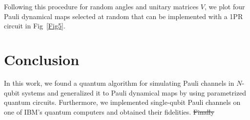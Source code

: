 \documentclass[10pt,letterpaper]{article} %
\newcommand{\fref}[1]{Fig~\ref{#1}}
\providecommand{\DIFdeltex}[1]{{\protect\color{red}\sout{#1}}}                      %
\providecommand{\DIFaddbegin}{} %
\providecommand{\DIFdelbegin}{} %
\providecommand{\DIFdelend}{} %
\providecommand{\DIFdel}[1]{\texorpdfstring{\DIFdeltex{#1}}{}} %
\newcommand{\DIFscaledelfig}{0.5}
\newlength{\DIFdelgraphicswidth} %
\newlength{\DIFdelgraphicsheight} %
\newcommand{\DIFaddincludegraphics}[2][]{{\color{blue}\fbox{\DIFOincludegraphics[#1]{#2}}}} %
\newcommand{\DIFdelincludegraphics}[2][]{%
\sbox{\DIFdelgraphicsbox}{\DIFOincludegraphics[#1]{#2}}%
\settoboxwidth{\DIFdelgraphicswidth}{\DIFdelgraphicsbox} %
\settoboxtotalheight{\DIFdelgraphicsheight}{\DIFdelgraphicsbox} %
\scalebox{\DIFscaledelfig}{%
\parbox[b]{\DIFdelgraphicswidth}{\usebox{\DIFdelgraphicsbox}\\[-\baselineskip] \rule{\DIFdelgraphicswidth}{0em}}\llap{\resizebox{\DIFdelgraphicswidth}{\DIFdelgraphicsheight}{%
\setlength{\unitlength}{\DIFdelgraphicswidth}%
\begin{picture}(1,1)%
\thicklines\linethickness{2pt} %
{\color[rgb]{1,0,0}\put(0,0){\framebox(1,1){}}}%
{\color[rgb]{1,0,0}\put(0,0){\line( 1,1){1}}}%
{\color[rgb]{1,0,0}\put(0,1){\line(1,-1){1}}}%
\end{picture}%
}\hspace*{3pt}}} %
} %
\DeclareRobustCommand{\DIFaddbegin}{\DIFOaddbegin \let\includegraphics\DIFaddincludegraphics} %
\DeclareRobustCommand{\DIFdelbegin}{\DIFOdelbegin \let\includegraphics\DIFdelincludegraphics} %
\DeclareRobustCommand{\DIFdelend}{\DIFOaddend \let\includegraphics\DIFOincludegraphics} %
\begin{document}
Following this procedure for random
angles and unitary matrices $V$, 
we plot four Pauli dynamical maps  selected at random
that can be implemented with a 1PR circuit in \fref{Fig5}. 

\section{Conclusion} %

In this work, we found a quantum algorithm for 
simulating Pauli channels in $N$-qubit systems and
generalized it to Pauli dynamical maps
by using parametrized quantum circuits.
Furthermore, we implemented single-qubit Pauli channels
on one of IBM's quantum computers
and obtained their fidelities. 
\DIFdelbegin \DIFdel{Finally}\DIFdelend \DIFaddbegin 
\end{document}
